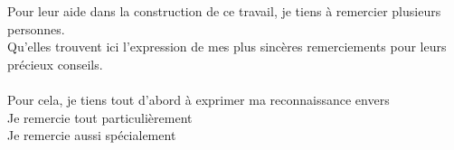 Pour leur aide dans la construction de ce travail, je tiens à remercier plusieurs personnes.\\
Qu’elles trouvent ici l’expression de mes plus sincères remerciements pour leurs précieux conseils.\\\\
Pour cela, je tiens tout d’abord à exprimer ma reconnaissance envers\\
Je remercie tout particulièrement\\
Je remercie aussi spécialement\\

\newpage